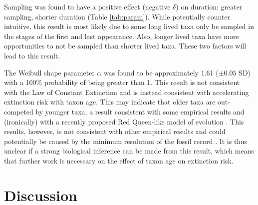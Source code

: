 \documentclass[11pt]{article}
\begin{document}
Sampling was found to have a positive effect (negative \(\delta\)) on duration: greater sampling, shorter duration (Table \ref{tab:param}). While potentially counter intuitive, this result is most likely due to some long lived taxa only be sampled in the stages of the first and last appearance. Also, longer lived taxa have more opportunities to not be sampled than shorter lived taxa. These two factors will lead to this result. 



The Weibull shape parameter \(\alpha\) was found to be approximately 1.61 (\(\pm 0.05\) SD) with a 100\% probability of being greater than 1. This result is not consistent with the Law of Constant Extinction \citep{VanValen1973} and is instead consistent with accelerating extinction risk with taxon age. This may indicate that older taxa are out-competed by younger taxa, a result consistent with some empirical results \citep{Wagner2014b,Quental2013,Smits2015} and (ironically) with a recently proposed Red Queen-like model of evolution \citep{Rosindell2015a}. This results, however, is not consistent with other empirical results \citep{Finnegan2008,Crampton2016} and could potentially be caused by the minimum resolution of the fossil record \citep{Sepkoski1975}. It is thus unclear if a strong biological inference can be made from this result, which means that further work is necessary on the effect of taxon age on extinction risk.




\section*{Discussion}
\end{document}
